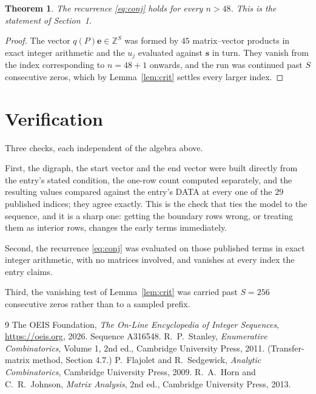 \documentclass[11pt,a4paper]{article}
\theoremstyle{plain}
\newtheorem{theorem}{Theorem}
\theoremstyle{definition}
\begin{document}
\begin{theorem}
The recurrence \eqref{eq:conj} holds for every $n>48$. This is the statement of
Section~1.
\end{theorem}

\begin{proof}
The vector $q(P)\mathbf{e}\in\mathbb{Z}^{S}$ was formed by $45$ matrix--vector
products in exact integer arithmetic and the $u_j$ evaluated against $\mathbf{s}$ in turn.
They vanish from the index corresponding to $n=48+1$ onwards, and the run was continued
past $S$ consecutive zeros, which by Lemma~\ref{lem:crit} settles every larger index.
\end{proof}

\section{Verification}

Three checks, each independent of the algebra above.

First, the digraph, the start vector and the end vector were built directly from the
entry's stated condition, the one-row count computed separately, and the resulting values
compared against the entry's DATA at every one of the $29$ published indices; they
agree exactly. This is the check that ties the model to the sequence, and it is a sharp one:
getting the boundary rows wrong, or treating them as interior rows, changes the early terms
immediately.

Second, the recurrence \eqref{eq:conj} was evaluated on those published terms in exact
integer arithmetic, with no matrices involved, and vanishes at every index the entry claims.

Third, the vanishing test of Lemma~\ref{lem:crit} was carried past $S=256$ consecutive
zeros rather than to a sampled prefix.

\begin{thebibliography}{9}
 The OEIS Foundation, \emph{The On-Line Encyclopedia of Integer
Sequences}, \url{https://oeis.org}, 2026. Sequence A316548.
 R.~P.~Stanley, \emph{Enumerative Combinatorics}, Volume 1, 2nd ed.,
Cambridge University Press, 2011. (Transfer-matrix method, Section 4.7.)
 P.~Flajolet and R.~Sedgewick, \emph{Analytic Combinatorics}, Cambridge
University Press, 2009.
 R.~A.~Horn and C.~R.~Johnson, \emph{Matrix Analysis}, 2nd ed., Cambridge
University Press, 2013.
\end{thebibliography}
\end{document}

